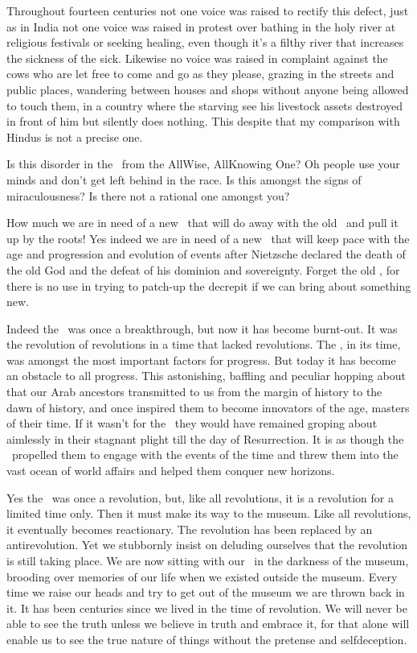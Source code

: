 \documentclass[12pt]{memoir}
\begin{document}
Throughout fourteen centuries not one voice was raised to rectify this defect,
just as in India not one voice was raised in protest
over bathing in the holy river at religious festivals or seeking healing,
even though it’s a filthy river that increases the sickness of the sick.
Likewise no voice was raised in complaint against the cows who are let free
to come and go as they please, grazing in the streets and public places,
wandering between houses and shops without anyone being allowed to touch them,
in a country where the starving see his livestock assets
destroyed in front of him but silently does nothing.
This despite that my comparison with Hindus is not a precise one.

Is this disorder in the \Quran\ from the All\–Wise, All\–Knowing One?
Oh people use your minds and don’t get left behind in the race.
Is this amongst the signs of miraculousness?
Is there not a rational one amongst you?

How much we are in need of a new \Quran\ that will do away
with the old \Quran\ and pull it up by the roots!
Yes indeed we are in need of a new \Quran\ that will keep pace with the age
and progression and evolution of events after Nietzsche declared the death
of the old God and the defeat of his dominion and sovereignty.
Forget the old \Quran, for there is no use in trying to patch-up
the decrepit if we can bring about something new.

Indeed the \Quran\ was once a breakthrough, but now it has become burnt-out.
It was the revolution of revolutions in a time that lacked revolutions.
The \Quran, in its time, was amongst the most important factors for progress.
But today it has become an obstacle to all progress.
This astonishing, baffling and peculiar hopping about that our Arab ancestors
transmitted to us from the margin of history to the dawn of history,
and once inspired them to become innovators of the age, masters of their time.
If it wasn’t for the \Quran\ they would have remained groping about
aimlessly in their stagnant plight till the day of Resurrection.
It is as though the \Quran\ propelled them to engage with the events
of the time and threw them into the vast ocean of world affairs
and helped them conquer new horizons.

Yes the \Quran\ was once a revolution, but, like all revolutions,
it is a revolution for a limited time only.
Then it must make its way to the museum.
Like all revolutions, it eventually becomes reactionary.
The revolution has been replaced by an anti\–revolution.
Yet we stubbornly insist on deluding ourselves
that the revolution is still taking place.
We are now sitting with our \Quran\ in the darkness of the museum,
brooding over memories of our life when we existed outside the museum.
Every time we raise our heads and try to get out of the museum
we are thrown back in it.
It has been centuries since we lived in the time of revolution.
We will never be able to see the truth unless
we believe in truth and embrace it,
for that alone will enable us to see the true nature of things
without the pretense and self\–deception.
\end{document}
